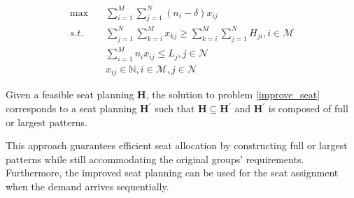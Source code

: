 \begin{equation}\label{improve_seat}
  \begin{aligned}
  \max \quad & \sum_{i=1}^{M} \sum_{j=1}^{N} (n_i-\delta)  x_{ij} \\
  s.t. \quad & \sum_{j=1}^{N} \sum_{k=i}^{M} x_{kj} \geq  \sum_{k=i}^{M} \sum_{j=1}^{N} H_{ji}, i \in \mathcal{M} \\
  & \sum_{i=1}^{M} n_{i} x_{ij} \leq L_{j}, j \in \mathcal{N} \\
  & x_{ij} \in \mathbb{N}, i \in \mathcal{M}, j \in \mathcal{N}
  \end{aligned}
\end{equation}

\begin{prop}\label{prop_construction}
Given a feasible seat planning $\bm{H}$, the solution to problem \eqref{improve_seat} corresponds to a seat planning $\bm{H}^{\prime}$ such that $\bm{H} \subseteq \bm{H}^{\prime}$ and $\bm{H}^{'}$ is composed of full or largest patterns.
\end{prop}


This approach guarantees efficient seat allocation by constructing full or largest patterns while still accommodating the original groups' requirements. Furthermore, the improved seat planning can be used for the seat assignment when the demand arrives sequentially.






